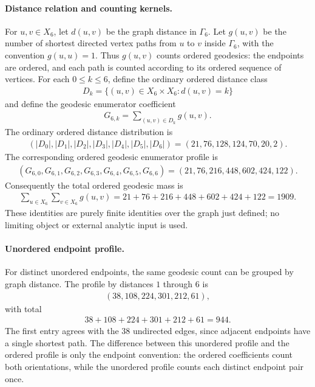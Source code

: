 \paragraph{Distance relation and counting kernels.}
For $u,v\in X_6$, let $d(u,v)$ be the graph distance in $\Gamma_6$.  Let $g(u,v)$ be the number of shortest directed vertex paths from $u$ to $v$ inside $\Gamma_6$, with the convention $g(u,u)=1$.  Thus $g(u,v)$ counts ordered geodesics: the endpoints are ordered, and each path is counted according to its ordered sequence of vertices.  For each $0\leq k\leq 6$, define the ordinary ordered distance class
$$
\begin{aligned}
D_k=\{(u,v)\in X_6\times X_6 : d(u,v)=k\}
\end{aligned}
$$
and define the geodesic enumerator coefficient
$$
\begin{aligned}
G_{6,k}=\sum_{(u,v)\in D_k} g(u,v).
\end{aligned}
$$
The ordinary ordered distance distribution is
$$
\begin{aligned}
(|D_0|,|D_1|,|D_2|,|D_3|,|D_4|,|D_5|,|D_6|)=(21,76,128,124,70,20,2).
\end{aligned}
$$
The corresponding ordered geodesic enumerator profile is
$$
\begin{aligned}
(G_{6,0},G_{6,1},G_{6,2},G_{6,3},G_{6,4},G_{6,5},G_{6,6})=(21,76,216,448,602,424,122).
\end{aligned}
$$
Consequently the total ordered geodesic mass is
$$
\begin{aligned}
\sum_{u\in X_6}\sum_{v\in X_6}g(u,v)=21+76+216+448+602+424+122=1909.
\end{aligned}
$$
These identities are purely finite identities over the graph just defined; no limiting object or external analytic input is used.

\paragraph{Unordered endpoint profile.}
For distinct unordered endpoints, the same geodesic count can be grouped by graph distance.  The profile by distances $1$ through $6$ is
$$
\begin{aligned}
(38,108,224,301,212,61),
\end{aligned}
$$
with total
$$
\begin{aligned}
38+108+224+301+212+61=944.
\end{aligned}
$$
The first entry agrees with the $38$ undirected edges, since adjacent endpoints have a single shortest path.  The difference between this unordered profile and the ordered profile is only the endpoint convention: the ordered coefficients count both orientations, while the unordered profile counts each distinct endpoint pair once.

